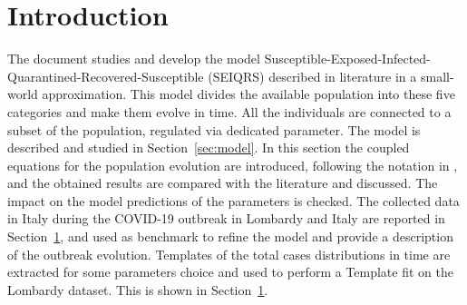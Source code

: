 \section{Introduction}
The document studies and develop the model Susceptible-Exposed-Infected-Quarantined-Recovered-Susceptible (SEIQRS) described in literature \cite{MingLiu} in a small-world approximation. This model divides the available population into these five categories and make them evolve in time. All the individuals are connected to a subset of the population, regulated via dedicated parameter. The model is described and studied in Section~\ref{sec:model}. In this section the coupled equations for the population evolution are introduced, following the notation in \cite{MingLiu}, and the obtained results are compared with the literature and discussed. The impact on the model predictions of the parameters is checked. The collected data in Italy during the COVID-19 outbreak in Lombardy and Italy are reported in Section~\ref{}, and used as benchmark to refine the model and provide a description of the outbreak evolution.
Templates of the total cases distributions in time are extracted for some parameters choice and used to perform a Template fit on the Lombardy dataset. This is shown in Section~\ref{}.